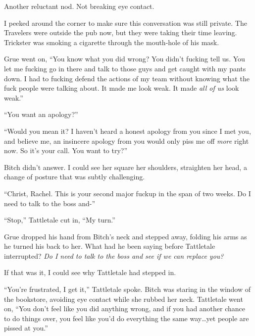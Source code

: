 Another reluctant nod.  Not breaking eye contact.



I peeked around the corner to make sure this conversation was still private.  The Travelers were outside the pub now, but they were taking their time leaving.  Trickster was smoking a cigarette through the mouth-hole of his mask.



Grue went on, ``You know what you did wrong?  You didn't fucking tell us.  You let me fucking go in there and talk to those guys and get caught with my pants down.  I had to fucking defend the actions of my team without knowing what the fuck people were talking about.  It made me look weak.  It made \emph{all of us} look weak.''



``You want an apology?''



``Would you mean it?  I haven't heard a honest apology from you since I met you, and believe me, an insincere apology from you would only piss me off \emph{more }right now.  So it's your call.  You want to try?''



Bitch didn't answer.  I could see her square her shoulders, straighten her head, a change of posture that was subtly challenging.



``Christ, Rachel.  This is your second major fuckup in the span of two weeks.  Do I need to talk to the boss and-''



``Stop,'' Tattletale cut in, ``My turn.''



Grue dropped his hand from Bitch's neck and stepped away, folding his arms as he turned his back to her.  What had he been saying before Tattletale interrupted?  \emph{Do I need to talk to the boss and see if we can replace you?}



If that was it, I could see why Tattletale had stepped in.



``You're frustrated, I get it,'' Tattletale spoke.  Bitch was staring in the window of the bookstore, avoiding eye contact while she rubbed her neck.  Tattletale went on, ``You don't feel like you did anything wrong, and if you had another chance to do things over, you feel like you'd do everything the same way\ldots yet people are pissed at you.''



